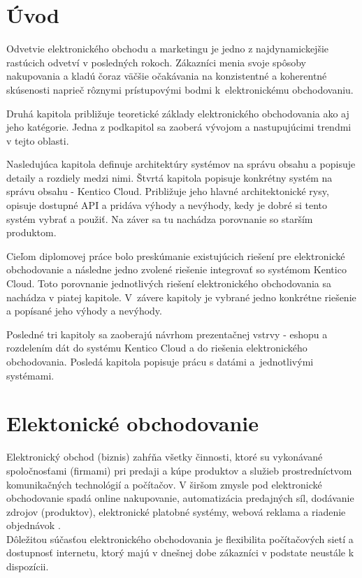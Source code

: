 \documentclass[
  printed, %
  table,   %
  lof,     %
  nolot,     %
  twoside,  
]{fithesis3}
\begin{document}
\chapter{Úvod}
 Odvetvie elektronického obchodu a marketingu je jedno z najdynamickejšie rastúcich odvetví v posledných rokoch. Zákazníci menia svoje spôsoby nakupovania a kladú čoraz väčšie očakávania na konzistentné a koherentné skúsenosti naprieč rôznymi prístupovými bodmi k~elektronickému obchodovaniu.
 
 Druhá kapitola približuje teoretické základy elektronického obchodovania ako aj jeho katégorie. Jedna z podkapitol sa zaoberá vývojom a nastupujúcimi trendmi v tejto oblasti.
 
 Nasledujúca kapitola definuje architektúry systémov na správu obsahu a popisuje detaily a rozdiely medzi nimi. Štvrtá kapitola popisuje konkrétny systém na správu obsahu - Kentico Cloud. Približuje jeho hlavné architektonické rysy, opisuje dostupné API a pridáva výhody a nevýhody,  kedy je dobré si tento systém vybrať a použiť. Na záver sa tu nachádza porovnanie so starším produktom.
 
 Cieľom diplomovej práce bolo preskúmanie existujúcich riešení pre elektronické obchodovanie a následne jedno zvolené riešenie integrovať so systémom Kentico Cloud. Toto porovnanie jednotlivých riešení elektronického obchodovania sa nachádza v piatej kapitole. V~závere kapitoly je vybrané jedno konkrétne riešenie a popísané jeho výhody a nevýhody. 
 
 Posledné tri kapitoly sa zaoberajú návrhom prezentačnej vstrvy - eshopu a rozdelením dát do systému Kentico Cloud a do riešenia elektronického obchodovania. Posledá kapitola popisuje prácu s datámi a~jednotlivými systémami.



\chapter{Elektonické obchodovanie}
Elektronický obchod (biznis) zahŕňa všetky činnosti, ktoré su vykonávané spoločnosťami (firmami) pri predaji a kúpe produktov a služieb prostredníctvom komunikačných technológií a počítačov. V širšom zmysle pod elektronické obchodovanie spadá online nakupovanie, automatizácia predajných síl, dodávanie zdrojov (produktov), elektronické platobné systémy, webová reklama a riadenie objednávok \cite{ec1}. \\
Dôležitou súčasťou elektronického obchodovania je flexibilita počítačových sietí a dostupnosť internetu, ktorý majú v dnešnej dobe zákazníci v podstate neustále k dispozícii.
\end{document}
